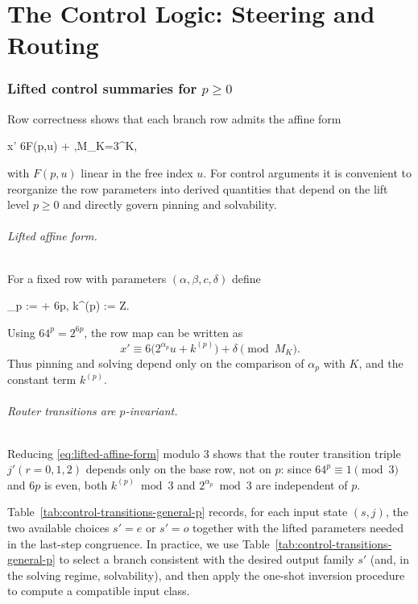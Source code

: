 \documentclass[11pt,letterpaper]{amsart}
\def\mathbb#1{#1}%
\def\[{ }%
\def\]{ }%
\theoremstyle{definition}
\theoremstyle{plain}
\theoremstyle{plain}
\theoremstyle{remark}
\begin{document}
\part{The Control Logic: Steering and Routing}


\section{Lifted control summaries for $p\ge 0$}
\label{sec:lifted-control-tables}

Row correctness shows that each branch row admits the affine form
\[
x' \equiv 6F(p,u) + \delta {},\qquad M_K=3^K,
\]
with $F(p,u)$ linear in the free index $u$.  For control arguments it is convenient to reorganize the row parameters
into derived quantities that depend on the lift level $p\ge 0$ and directly govern pinning and solvability.

\paragraph{Lifted affine form.}
For a fixed row with parameters $(\alpha,\beta,c,\delta)$ define
\[
\alpha_p := \alpha + 6p,
\qquad
k^{(p)} := \in\mathbb Z.
\]
Using $64^p=2^{6p}$, the row map can be written as
\begin{equation}
\label{eq:lifted-affine-form}
x' \equiv 6\bigl(2^{\alpha_p}u + k^{(p)}\bigr)+\delta \pmod{M_K}.
\end{equation}
Thus pinning and solving depend only on the comparison of $\alpha_p$ with $K$, and the constant term $k^{(p)}$.

\paragraph{Router transitions are $p$-invariant.}
Reducing \eqref{eq:lifted-affine-form} modulo $3$ shows that the router transition triple $j'(r=0,1,2)$ depends only on the base row,
not on $p$: since $64^p\equiv 1\pmod 3$ and $6p$ is even, both $k^{(p)}\bmod 3$ and $2^{\alpha_p}\bmod 3$ are independent of $p$.

Table~\ref{tab:control-transitions-general-p} records, for each input state $(s,j)$, the two available choices $s'=e$ or $s'=o$
together with the lifted parameters needed in the last-step congruence.
In practice, we use Table~\ref{tab:control-transitions-general-p} to select a branch consistent with the desired output family $s'$
(and, in the solving regime, solvability), and then apply the one-shot inversion procedure to compute a compatible input class.
\end{document}
